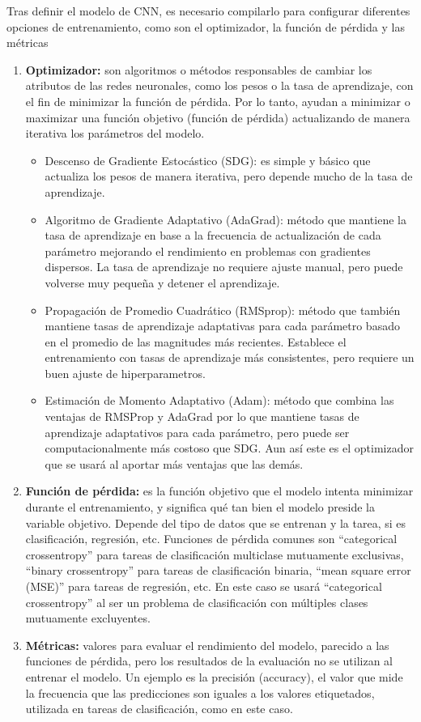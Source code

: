 \documentclass[12pt]{report} %
\begin{document}
\begin{itemize}
\end{itemize}

Tras definir el modelo de CNN, es necesario compilarlo para configurar diferentes opciones de entrenamiento, como son el optimizador, la función de pérdida y las métricas

\begin{enumerate}

    \item \textbf{Optimizador:} son algoritmos o métodos responsables de cambiar los atributos de las redes neuronales, como los pesos o la tasa de aprendizaje, con el fin de minimizar la función de pérdida. Por lo tanto, ayudan a minimizar o maximizar una función objetivo (función de pérdida) actualizando de manera iterativa los parámetros del modelo.
		\begin{itemize}
			\item Descenso de Gradiente Estocástico (SDG): es simple y básico que actualiza los pesos de manera iterativa, pero depende mucho de la tasa de aprendizaje. 
			\item Algoritmo de Gradiente Adaptativo (AdaGrad): método que mantiene la tasa de aprendizaje en base a la frecuencia de actualización de cada parámetro mejorando el rendimiento en problemas con gradientes dispersos. La tasa de aprendizaje no requiere ajuste manual, pero puede volverse muy pequeña y detener el aprendizaje.
			\item Propagación de Promedio Cuadrático (RMSprop): método que también mantiene tasas de aprendizaje adaptativas para cada parámetro basado en el promedio de las magnitudes más recientes. Establece el entrenamiento con tasas de aprendizaje más consistentes, pero requiere un buen ajuste de hiperparametros.
			\item Estimación de Momento Adaptativo (Adam): método que combina las ventajas de RMSProp y AdaGrad por lo que mantiene tasas de aprendizaje adaptativos para cada parámetro, pero puede ser computacionalmente más costoso que SDG. Aun así este es el optimizador que se usará al aportar más ventajas que las demás.
		\end{itemize}
    \item \textbf{Función de pérdida:} es la función objetivo que el modelo intenta minimizar durante el entrenamiento, y significa qué tan bien el modelo preside la variable objetivo. Depende del tipo de datos que se entrenan y la tarea, si es clasificación, regresión, etc. Funciones de pérdida comunes son “categorical crossentropy” para tareas de clasificación multiclase mutuamente exclusivas, “binary crossentropy” para tareas de clasificación binaria, “mean square error (MSE)” para tareas de regresión, etc. En este caso se usará “categorical crossentropy” al ser un problema de clasificación con múltiples clases mutuamente excluyentes.
    \item \textbf{Métricas:} valores para evaluar el rendimiento del modelo, parecido a las funciones de pérdida, pero los resultados de la evaluación no se utilizan al entrenar el modelo. Un ejemplo es la precisión (accuracy), el valor que mide la frecuencia que las predicciones son iguales a los valores etiquetados, utilizada en tareas de clasificación, como en este caso.


\end{enumerate}
\end{document}
